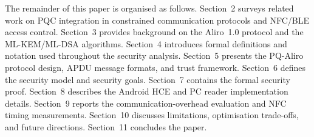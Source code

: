 \noindent
The remainder of this paper is organised as follows.
Section~2 surveys related work on PQC integration in constrained communication protocols and NFC/BLE access control.
Section~3 provides background on the Aliro~1.0 protocol and the ML-KEM/ML-DSA algorithms.
Section~4 introduces formal definitions and notation used throughout the security analysis.
Section~5 presents the PQ-Aliro protocol design, APDU message formats, and trust framework.
Section~6 defines the security model and security goals.
Section~7 contains the formal security proof.
Section~8 describes the Android HCE and PC reader implementation details.
Section~9 reports the communication-overhead evaluation and NFC timing measurements.
Section~10 discusses limitations, optimisation trade-offs, and future directions.
Section~11 concludes the paper.
